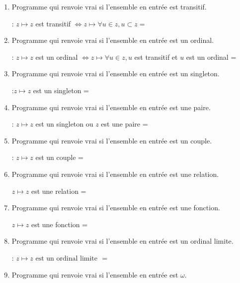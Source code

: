 \documentclass[a4paper, 11pt]{article}
\begin{document}
\begin{enumerate}
    \item Programme qui renvoie vrai si l'ensemble en entrée est transitif.
    
    : $z \mapsto z$ est transitif $ \iff z \mapsto \forall u \in z, u \subset z = $
    
    \item Programme qui renvoie vrai si l'ensemble en entrée est un ordinal.
    
    : $z \mapsto z$ est un ordinal $ \iff z \mapsto \forall u \in z, u $ est transitif et $ u $ est un ordinal = 
    
    \item Programme qui renvoie vrai si l'ensemble en entrée est un singleton.
    
    :$z \mapsto z$ est un singleton = 
    \item Programme qui renvoie vrai si l'ensemble en entrée est une paire.
    
    : $z \mapsto z$ est un singleton ou $z$ est une paire = 
    \item Programme qui renvoie vrai si l'ensemble en entrée est un couple.
    
    : $z \mapsto z$ est un couple = 
    \item Programme qui renvoie vrai si l'ensemble en entrée est une relation.
    
    $z \mapsto z$ est une relation = 
    \item Programme qui renvoie vrai si l'ensemble en entrée est une fonction.
    
    $z \mapsto z$ est une fonction = 
    \item Programme qui renvoie vrai si l'ensemble en entrée est un ordinal limite.

    : $z \mapsto z \mbox{ est un ordinal limite }$ = 
    \item Programme qui renvoie vrai si l'ensemble en entrée est $\omega$.
    

\end{enumerate}
\end{document}
